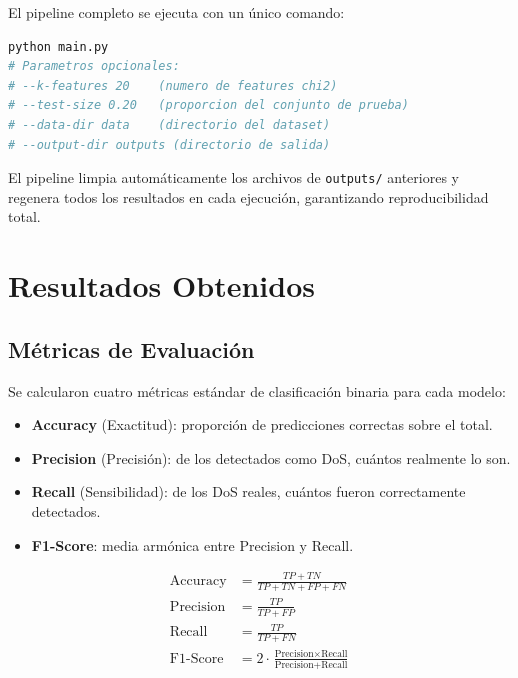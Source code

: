 \documentclass[12pt,a4paper]{article}
\begin{document}
El pipeline completo se ejecuta con un único comando:
\begin{lstlisting}[style=pythonstyle, language=bash, caption={Ejecución del pipeline}]
python main.py
# Parametros opcionales:
# --k-features 20    (numero de features chi2)
# --test-size 0.20   (proporcion del conjunto de prueba)
# --data-dir data    (directorio del dataset)
# --output-dir outputs (directorio de salida)
\end{lstlisting}

El pipeline limpia automáticamente los archivos de \texttt{outputs/} anteriores y regenera
todos los resultados en cada ejecución, garantizando reproducibilidad total.

\section{Resultados Obtenidos}
\label{sec:resultados}

\subsection{Métricas de Evaluación}

Se calcularon cuatro métricas estándar de clasificación binaria para cada modelo:

\begin{itemize}
    \item \textbf{Accuracy} (Exactitud): proporción de predicciones correctas sobre el total.
    \item \textbf{Precision} (Precisión): de los detectados como DoS, cuántos realmente lo son.
    \item \textbf{Recall} (Sensibilidad): de los DoS reales, cuántos fueron correctamente detectados.
    \item \textbf{F1-Score}: media armónica entre Precision y Recall.
\end{itemize}

\begin{align}
    \text{Accuracy}  &= \frac{TP + TN}{TP + TN + FP + FN} \\[4pt]
    \text{Precision} &= \frac{TP}{TP + FP} \\[4pt]
    \text{Recall}    &= \frac{TP}{TP + FN} \\[4pt]
    \text{F1-Score}  &= 2 \cdot \frac{\text{Precision} \times \text{Recall}}{\text{Precision} + \text{Recall}}
\end{align}
\end{document}
